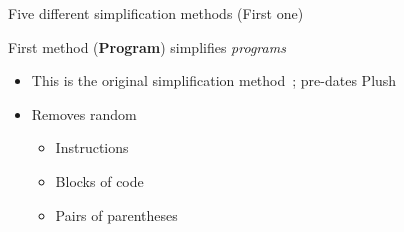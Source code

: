 \documentclass{beamer}
\begin{document}
\begin{frame}{Five different simplification methods (First one)}

First method (\textbf{Program}) simplifies \emph{programs}
\begin{itemize}
	\item This is the original simplification method~\cite{Spector:2014:GECCOcomp}; pre-dates Plush
	\item Removes random 
	\begin{itemize}
		\item Instructions
		\item Blocks of code
		\item Pairs of parentheses
	\end{itemize}
\end{itemize}


\end{frame}
\end{document}
